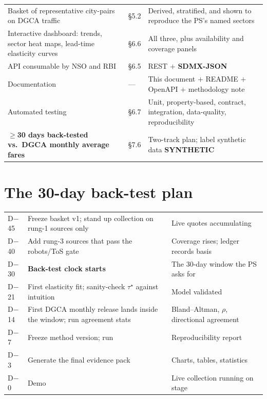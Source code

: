\begin{center}
\begin{tabularx}{\textwidth}{@{}L{6.0cm} L{2.0cm} X@{}}
Basket of representative city-pairs on DGCA traffic & \S5.2 & Derived, stratified, and shown to reproduce the PS's named sectors \\
Interactive dashboard: trends, sector heat maps, lead-time elasticity curves & \S6.6 & All three, plus availability and coverage panels \\
API consumable by NSO and RBI & \S6.5 & REST $+$ \textbf{SDMX-JSON} \\
Documentation & --- & This document $+$ README $+$ OpenAPI $+$ methodology note \\
Automated testing & \S6.7 & Unit, property-based, contract, integration, data-quality, reproducibility \\
\textbf{$\ge$30 days back-tested vs.\ DGCA monthly average fares} & \S7.6 & Two-track plan; label synthetic data \textbf{SYNTHETIC} \\
\bottomrule
\end{tabularx}
\end{center}

\section{The 30-day back-test plan}

\begin{center}
\footnotesize
\begin{tabularx}{\textwidth}{@{}L{2.2cm} L{3.6cm} X@{}}
\toprule
{} &  &  \\
\midrule
D$-$45 & Freeze basket v1; stand up collection on rung-1 sources only & Live quotes accumulating \\
D$-$40 & Add rung-3 sources that pass the robots/ToS gate & Coverage rises; ledger records basis \\
D$-$30 & \textbf{Back-test clock starts} & The 30-day window the PS asks for \\
D$-$21 & First elasticity fit; sanity-check $\tau^\star$ against intuition & Model validated \\
D$-$14 & First DGCA monthly release lands inside the window; run agreement stats & Bland--Altman, $\rho$, directional agreement \\
D$-$7 & Freeze method version; run  & Reproducibility report \\
D$-$3 & Generate the final evidence pack & Charts, tables, statistics \\
D$-$0 & Demo & Live collection running on stage \\
\bottomrule
\end{tabularx}
\end{center}


